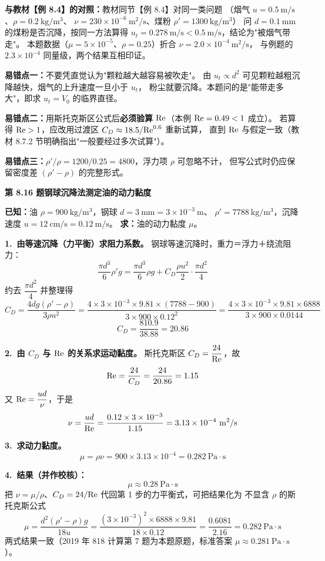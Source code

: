 \begin{tishi}
\textbf{与教材【例 8.4】的对照：}教材同节【例 8.4】对同一类问题
（烟气 $u=0.5\ \mathrm{m/s}$、$\rho=0.2\ \mathrm{kg/m^3}$、
$\nu=230\times10^{-6}\ \mathrm{m^2/s}$、煤粉 $\rho'=1300\ \mathrm{kg/m^3}$）
问 $d=0.1\ \mathrm{mm}$ 的煤粉是否沉降，按同一方法算得
$u_t=0.278\ \mathrm{m/s}<0.5\ \mathrm{m/s}$，结论为"被烟气带走"。
本题数据（$\mu=5\times10^{-5}$、$\rho=0.25$）折合 $\nu=2.0\times10^{-4}\ \mathrm{m^2/s}$，
与例题的 $2.3\times10^{-4}$ 同量级，两个结果互相印证。
\end{tishi}

\begin{yicuo}
\textbf{易错点一：}不要凭直觉认为"颗粒越大越容易被吹走"。
由 $u_t\propto d^2$ 可见颗粒越粗沉降越快，烟气的上升速度一旦小于 $u_t$，
粉尘就要沉降。本题问的是"能带走多大"，即求 $u_t=V_0$ 的临界直径。

\textbf{易错点二：}用斯托克斯区公式后\textbf{必须验算 $\mathrm{Re}$}（本例 $\mathrm{Re}=0.49<1$ 成立）。
若算得 $\mathrm{Re}>1$，应改用过渡区 $C_D\approx18.5/\mathrm{Re}^{0.6}$ 重新试算，
直到 $\mathrm{Re}$ 与假定一致（教材 8.7.2 节明确指出"一般要经过多次试算"）。

\textbf{易错点三：}$\rho'/\rho=1200/0.25=4800$，浮力项 $\rho$ 可忽略不计，
但写公式时仍应保留密度差 $(\rho'-\rho)$ 的完整形式。
\end{yicuo}

\noindent\textbf{第 8.16 题\quad 钢球沉降法测定油的动力黏度}

\begin{jie}
\textbf{已知：}油 $\rho=900\ \mathrm{kg/m^3}$，钢球 $d=3\ \mathrm{mm}=3\times10^{-3}\ \mathrm{m}$、
$\rho'=7788\ \mathrm{kg/m^3}$，沉降速度 $u=12\ \mathrm{cm/s}=0.12\ \mathrm{m/s}$。
\textbf{求：}油的动力黏度 $\mu$。

\textbf{1.\ 由等速沉降（力平衡）求阻力系数。}
钢球等速沉降时，重力＝浮力＋绕流阻力：
\[
\frac{\pi d^3}{6}\rho'g=\frac{\pi d^3}{6}\rho g+C_D\frac{\rho u^2}{2}\cdot\frac{\pi d^2}{4}
\]
约去 $\dfrac{\pi d^2}{4}$ 并整理得
\[
C_D=\frac{4dg(\rho'-\rho)}{3\rho u^2}
=\frac{4\times3\times10^{-3}\times9.81\times(7788-900)}{3\times900\times0.12^2}
=\frac{4\times3\times10^{-3}\times9.81\times6888}{3\times900\times0.0144}
\]
\[
C_D=\frac{810.9}{38.88}=20.86
\]

\textbf{2.\ 由 $C_D$ 与 $\mathrm{Re}$ 的关系求运动黏度。}
斯托克斯区 $C_D=\dfrac{24}{\mathrm{Re}}$，故
\[
\mathrm{Re}=\frac{24}{C_D}=\frac{24}{20.86}=1.15
\]
又 $\mathrm{Re}=\dfrac{ud}{\nu}$，于是
\[
\nu=\frac{ud}{\Rey}=\frac{0.12\times3\times10^{-3}}{1.15}=3.13\times10^{-4}\ \mathrm{m^2/s}
\]

\textbf{3.\ 求动力黏度。}
\[
\mu=\rho\nu=900\times3.13\times10^{-4}=0.282\ \mathrm{Pa\cdot s}
\]

\textbf{4.\ 结果（并作校核）：}
\[
\boxed{\,\mu\approx0.28\ \mathrm{Pa\cdot s}\,}
\]
把 $\nu=\mu/\rho$、$C_D=24/\mathrm{Re}$ 代回第 1 步的力平衡式，可把结果化为
不显含 $\rho$ 的斯托克斯公式
\[
\mu=\frac{d^2(\rho'-\rho)g}{18u}
=\frac{(3\times10^{-3})^2\times6888\times9.81}{18\times0.12}
=\frac{0.6081}{2.16}=0.282\ \mathrm{Pa\cdot s}
\]
两式结果一致（2019 年 818 计算第 7 题为本题原题，标准答案 $\mu\approx0.281\ \mathrm{Pa\cdot s}$）。
\end{jie}


